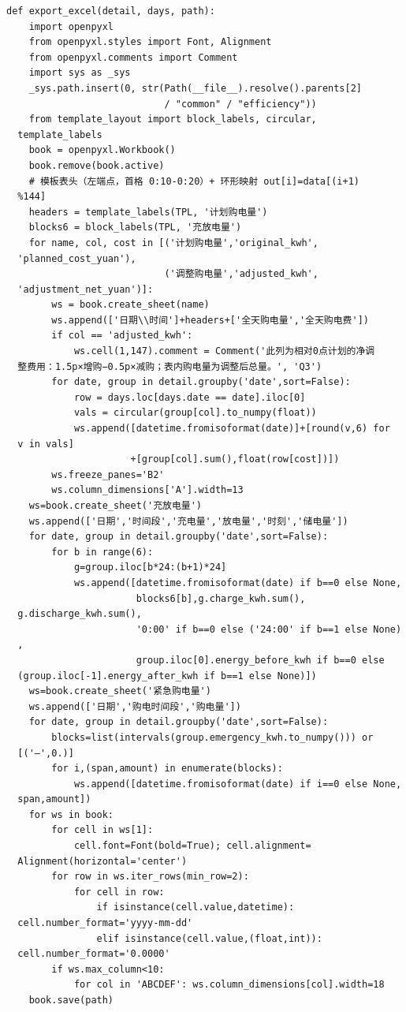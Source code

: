 \begin{verbatim}
def export_excel(detail, days, path):
    import openpyxl
    from openpyxl.styles import Font, Alignment
    from openpyxl.comments import Comment
    import sys as _sys
    _sys.path.insert(0, str(Path(__file__).resolve().parents[2]
                            / "common" / "efficiency"))
    from template_layout import block_labels, circular,
  template_labels
    book = openpyxl.Workbook()
    book.remove(book.active)
    # 模板表头（左端点，首格 0:10-0:20）+ 环形映射 out[i]=data[(i+1)
  %144]
    headers = template_labels(TPL, '计划购电量')
    blocks6 = block_labels(TPL, '充放电量')
    for name, col, cost in [('计划购电量','original_kwh',
  'planned_cost_yuan'),
                            ('调整购电量','adjusted_kwh',
  'adjustment_net_yuan')]:
        ws = book.create_sheet(name)
        ws.append(['日期\\时间']+headers+['全天购电量','全天购电费'])
        if col == 'adjusted_kwh':
            ws.cell(1,147).comment = Comment('此列为相对0点计划的净调
  整费用：1.5p×增购−0.5p×减购；表内购电量为调整后总量。', 'Q3')
        for date, group in detail.groupby('date',sort=False):
            row = days.loc[days.date == date].iloc[0]
            vals = circular(group[col].to_numpy(float))
            ws.append([datetime.fromisoformat(date)]+[round(v,6) for
  v in vals]
                      +[group[col].sum(),float(row[cost])])
        ws.freeze_panes='B2'
        ws.column_dimensions['A'].width=13
    ws=book.create_sheet('充放电量')
    ws.append(['日期','时间段','充电量','放电量','时刻','储电量'])
    for date, group in detail.groupby('date',sort=False):
        for b in range(6):
            g=group.iloc[b*24:(b+1)*24]
            ws.append([datetime.fromisoformat(date) if b==0 else None,
                       blocks6[b],g.charge_kwh.sum(),
  g.discharge_kwh.sum(),
                       '0:00' if b==0 else ('24:00' if b==1 else None)
  ,
                       group.iloc[0].energy_before_kwh if b==0 else
  (group.iloc[-1].energy_after_kwh if b==1 else None)])
    ws=book.create_sheet('紧急购电量')
    ws.append(['日期','购电时间段','购电量'])
    for date, group in detail.groupby('date',sort=False):
        blocks=list(intervals(group.emergency_kwh.to_numpy())) or
  [('—',0.)]
        for i,(span,amount) in enumerate(blocks):
            ws.append([datetime.fromisoformat(date) if i==0 else None,
  span,amount])
    for ws in book:
        for cell in ws[1]:
            cell.font=Font(bold=True); cell.alignment=
  Alignment(horizontal='center')
        for row in ws.iter_rows(min_row=2):
            for cell in row:
                if isinstance(cell.value,datetime):
  cell.number_format='yyyy-mm-dd'
                elif isinstance(cell.value,(float,int)):
  cell.number_format='0.0000'
        if ws.max_column<10:
            for col in 'ABCDEF': ws.column_dimensions[col].width=18
    book.save(path)



\end{verbatim}
